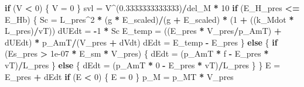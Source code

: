 \documentclass[]{article}
\newenvironment{Shaded}{\begin{snugshade}}{\end{snugshade}}
\newcommand{\DecValTok}[1]{\textcolor[rgb]{0.00,0.00,0.81}{#1}}
\newcommand{\FloatTok}[1]{\textcolor[rgb]{0.00,0.00,0.81}{#1}}
\newcommand{\StringTok}[1]{\textcolor[rgb]{0.31,0.60,0.02}{#1}}
\newcommand{\ControlFlowTok}[1]{\textcolor[rgb]{0.13,0.29,0.53}{\textbf{#1}}}
\newcommand{\OperatorTok}[1]{\textcolor[rgb]{0.81,0.36,0.00}{\textbf{#1}}}
\newcommand{\NormalTok}[1]{#1}
\begin{document}
\begin{Shaded}
\begin{Highlighting}[]
{{{    \ControlFlowTok{if}\NormalTok{ (V }\OperatorTok{<}\StringTok{ }\DecValTok{0}\NormalTok{) \{}
\NormalTok{        V =}\StringTok{ }\DecValTok{0}
\NormalTok{    \}}
\NormalTok{    svl =}\StringTok{ }\NormalTok{V}\OperatorTok{^}\NormalTok{(}\FloatTok{0.3333333333333}\NormalTok{)}\OperatorTok{/}\NormalTok{del_M }\OperatorTok{*}\StringTok{ }\DecValTok{10}
    \ControlFlowTok{if}\NormalTok{ (E_H_pres }\OperatorTok{<=}\StringTok{ }\NormalTok{E_Hb) \{}
\NormalTok{        Sc =}\StringTok{ }\NormalTok{L_pres}\OperatorTok{^}\DecValTok{2} \OperatorTok{*}\StringTok{ }\NormalTok{(g }\OperatorTok{*}\StringTok{ }\NormalTok{E_scaled)}\OperatorTok{/}\NormalTok{(g }\OperatorTok{+}\StringTok{ }\NormalTok{E_scaled) }\OperatorTok{*}\StringTok{ }\NormalTok{(}\DecValTok{1} \OperatorTok{+}\StringTok{ }
\StringTok{            }\NormalTok{((k_Mdot }\OperatorTok{*}\StringTok{ }\NormalTok{L_pres)}\OperatorTok{/}\NormalTok{vT))}
\NormalTok{        dUEdt =}\StringTok{ }\OperatorTok{-}\DecValTok{1} \OperatorTok{*}\StringTok{ }\NormalTok{Sc}
\NormalTok{        E_temp =}\StringTok{ }\NormalTok{((E_pres }\OperatorTok{*}\StringTok{ }\NormalTok{V_pres}\OperatorTok{/}\NormalTok{p_AmT) }\OperatorTok{+}\StringTok{ }\NormalTok{dUEdt) }\OperatorTok{*}\StringTok{ }\NormalTok{p_AmT}\OperatorTok{/}\NormalTok{(V_pres }\OperatorTok{+}\StringTok{ }
\StringTok{            }\NormalTok{dVdt)}
\NormalTok{        dEdt =}\StringTok{ }\NormalTok{E_temp }\OperatorTok{-}\StringTok{ }\NormalTok{E_pres}
\NormalTok{    \}}
    \ControlFlowTok{else}\NormalTok{ \{}
        \ControlFlowTok{if}\NormalTok{ (Es_pres }\OperatorTok{>}\StringTok{ }\FloatTok{1e-07} \OperatorTok{*}\StringTok{ }\NormalTok{E_sm }\OperatorTok{*}\StringTok{ }\NormalTok{V_pres) \{}
\NormalTok{            dEdt =}\StringTok{ }\NormalTok{(p_AmT }\OperatorTok{*}\StringTok{ }\NormalTok{f }\OperatorTok{-}\StringTok{ }\NormalTok{E_pres }\OperatorTok{*}\StringTok{ }\NormalTok{vT)}\OperatorTok{/}\NormalTok{L_pres}
\NormalTok{        \}}
        \ControlFlowTok{else}\NormalTok{ \{}
\NormalTok{            dEdt =}\StringTok{ }\NormalTok{(p_AmT }\OperatorTok{*}\StringTok{ }\DecValTok{0} \OperatorTok{-}\StringTok{ }\NormalTok{E_pres }\OperatorTok{*}\StringTok{ }\NormalTok{vT)}\OperatorTok{/}\NormalTok{L_pres}
\NormalTok{        \}}
\NormalTok{    \}}
\NormalTok{    E =}\StringTok{ }\NormalTok{E_pres }\OperatorTok{+}\StringTok{ }\NormalTok{dEdt}
    \ControlFlowTok{if}\NormalTok{ (E }\OperatorTok{<}\StringTok{ }\DecValTok{0}\NormalTok{) \{}
\NormalTok{        E =}\StringTok{ }\DecValTok{0}
\NormalTok{    \}}
\NormalTok{    p_M =}\StringTok{ }\NormalTok{p_MT }\OperatorTok{*}\StringTok{ }\NormalTok{V_pres}
}}}
\end{Highlighting}
\end{Shaded}
\end{document}
